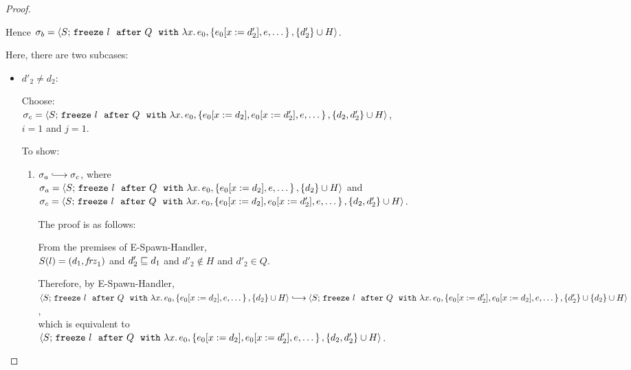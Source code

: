 \begin{proof}
\begin{itemize}
\begin{itemize}
        Hence $\sigma_b =
        \langle S;\, \mbox{\texttt{freeze}}~l~~{\mbox{\texttt{after}}}~Q~~{\mbox{\texttt{with}}}~\lambda x.\,e_0, \left\{e_0[x := d'_2],
              e, \dots\right\}, \{d'_2\}\cup H \rangle$.

        Here, there are two subcases:
        \begin{itemize}
        \item $d'_2 \neq d_2$:

          Choose: \\ 

          $\sigma_c = \langle S;\, \mbox{\texttt{freeze}}~l~~{\mbox{\texttt{after}}}~Q~~{\mbox{\texttt{with}}}~\lambda x.\,e_0, \left\{e_0[x := d_2],
                e_0[x := d'_2], e, \dots\right\}, \{d_2, d'_2\}\cup H \rangle$, \\
          $i = 1$ and $j = 1$.

          To show:
          \begin{enumerate}
          \item $\conf_a \parstepsto \conf_c$, where \\
            $\sigma_a = \langle S;\, \mbox{\texttt{freeze}}~l~~{\mbox{\texttt{after}}}~Q~~{\mbox{\texttt{with}}}~\lambda x.\,e_0, \left\{e_0[x := d_2],
                e, \dots\right\}, \{d_2\}\cup H \rangle$ and \\
            $\sigma_c = \langle S;\, \mbox{\texttt{freeze}}~l~~{\mbox{\texttt{after}}}~Q~~{\mbox{\texttt{with}}}~\lambda x.\,e_0, \left\{e_0[x := d_2],
                  e_0[x := d'_2], e, \dots\right\}, \{d_2, d'_2\}\cup H \rangle$.

            The proof is as follows:

            From the premises of {\sc E-Spawn-Handler}, \\
            $S(l) = (d_1, \mathit{frz}_1)$ and
            $d'_2 \sqsubseteq d_1$ and 
            $d'_2 \notin H$ and
            $d'_2 \in Q$.

            Therefore, by {\sc E-Spawn-Handler}, \\
            $\config{S}{\freezeafterfull{l}{Q}{\lam{x}{e_0}}{\setof{\subst{e_0}{x}{d_2},
                e, \dots}} {\{d_2\}\cup H}} \parstepsto \\
            \config{S}{\freezeafterfull{l}{Q}{\lam{x}{e_0}}{\setof{\subst{e_0}{x}{d'_2}, \subst{e_0}{x}{d_2},
                  e, \dots}} \setof{d'_2} \cup {\{d_2\}\cup H}}$, \\
            which is equivalent to \\

            $\langle S;\, \mbox{\texttt{freeze}}~l~~{\mbox{\texttt{after}}}~Q~~{\mbox{\texttt{with}}}~\lambda x.\,e_0, \left\{e_0[x := d_2],
                  e_0[x := d'_2], e, \dots\right\}, \{d_2, d'_2\}\cup
                H \rangle$.


\end{enumerate}
\end{itemize}
\end{itemize}
\end{itemize}
\end{proof}
